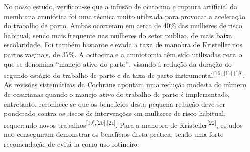 \documentclass{article}
\begin{document}
No nosso estudo, verificou-se que a infusão de ocitocina e ruptura artificial da
membrana amniótica foi uma técnica muito utilizada para provocar a aceleração do
trabalho de parto. Ambas ocorreram em cerca de 40\% das mulheres de risco
habitual,
sendo mais frequente nas mulheres do setor publico, de mais baixa escolaridade.
Foi
também bastante elevada a taxa de manobra de Kristeller nos partos vaginais, de
37\%.
A ocitocina e a amniotomia têm sido utilizadas para o que se denomina “manejo
ativo
do parto”, visando à redução da duração do segundo estágio do trabalho de parto
e da
taxa de parto instrumental\textsuperscript{[}\textsuperscript{16}\textsuperscript{]}\textsuperscript{,}\textsuperscript{[}\textsuperscript{17}\textsuperscript{]}\textsuperscript{,}\textsuperscript{[}\textsuperscript{18}\textsuperscript{]}. As revisões sistemáticas da Cochrane apontam uma redução
modesta do número de cesarianas quando o manejo ativo do trabalho de parto é
implementado, entretanto, reconhece-se que os benefícios desta pequena redução
deve
ser ponderado contra os riscos de intervenções em mulheres de risco habitual,
requerendo novos trabalhos\textsuperscript{[}\textsuperscript{19}\textsuperscript{]}\textsuperscript{,}\textsuperscript{[}\textsuperscript{20}\textsuperscript{]}\textsuperscript{,}\textsuperscript{[}\textsuperscript{21}\textsuperscript{]}. Para a manobra de Kristeller\textsuperscript{[}\textsuperscript{22}\textsuperscript{]}, estudos não conseguiram demonstrar os benefícios
desta prática, tendo uma forte recomendação de evitá-la como uso rotineiro.
\end{document}
